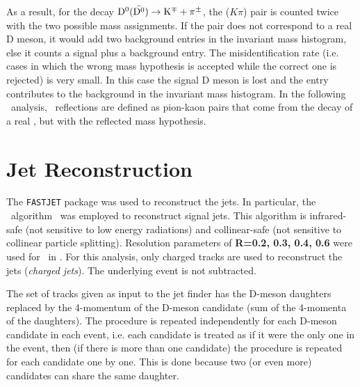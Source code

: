 As a result, for the decay $\mathrm{D^{0}} (\bar{\mathrm{D^{0}}}) \to {\rm K}^{\mp} + \pi^{\pm}$, the ($K\pi$) pair is counted twice with the two possible mass assignments. If the pair does not correspond
to a real D meson, it would add two background entries in the invariant mass histogram, else it 
counts a signal plus a background entry. 
The misidentification rate (i.e. cases in which the wrong mass
hypothesis is accepted while the correct one is rejected) is very small. In this case the signal D meson
is lost and the entry contributes to the background in the invariant mass histogram. In the following \Dzero\ analysis, \Dzero\
reflections are defined as pion-kaon pairs that come from the decay of a real \Dzero, but with the reflected mass hypothesis.



\section{Jet Reconstruction}

The \texttt{FASTJET}\cite{Cacciari:2012} package was used to reconstruct the jets. 
In particular, the \antikt\ algorithm~\cite{Cacciari:2008c} was employed to reconstruct signal jets. 
This algorithm is infrared-safe (not sensitive to low energy radiations) and collinear-safe (not sensitive to collinear particle splitting).
Resolution parameters of {\textbf{R=0.2, 0.3, 0.4, 0.6}} were used for \Dzero\ in \pp.
For this analysis, only charged tracks are used to reconstruct the jets (\emph{charged jets}). The underlying event is not subtracted.

The set of tracks given as input to the jet finder has the D-meson daughters replaced 
by the 4-momentum of the D-meson candidate (sum of the 4-momenta of the daughters).
The procedure is repeated independently for each D-meson candidate in each event, 
i.e. each candidate is treated as if it were the only one in the event, then (if there is more than one candidate) the procedure
is repeated for each candidate one by one.
This is done because two (or even more) candidates can share the same daughter. 


